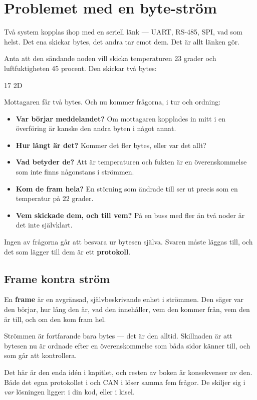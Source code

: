 \section{Problemet med en byte-ström}
\label{sec:stream}

Två system kopplas ihop med en seriell länk --- UART, RS-485, SPI, vad som helst. Det ena skickar
bytes, det andra tar emot dem. Det är allt länken gör.

Anta att den sändande noden vill skicka temperaturen 23 grader och luftfuktigheten 45 procent.
Den skickar två bytes:

\begin{console}
17 2D
\end{console}

Mottagaren får två bytes. Och nu kommer frågorna, i tur och ordning:

\begin{itemize}
  \item \textbf{Var börjar meddelandet?} Om mottagaren kopplades in mitt i en överföring är
     kanske den andra byten i något annat.
  \item \textbf{Hur långt är det?} Kommer det fler bytes, eller var det allt?
  \item \textbf{Vad betyder de?} Att  är temperaturen och  fukten är en
    överenskommelse som inte finns någonstans i strömmen.
  \item \textbf{Kom de fram hela?} En störning som ändrade  till  ser ut precis
    som en temperatur på 22 grader.
  \item \textbf{Vem skickade dem, och till vem?} På en buss med fler än två noder är det inte
    självklart.
\end{itemize}

Ingen av frågorna går att besvara ur bytesen själva. Svaren måste läggas till, och det som lägger
till dem är ett \textbf{protokoll}.

\subsection{Frame kontra ström}

En \textbf{frame} är en avgränsad, självbeskrivande enhet i strömmen. Den säger var den börjar,
hur lång den är, vad den innehåller, vem den kommer från, vem den är till, och om den kom fram
hel.

Strömmen är fortfarande bara bytes --- det är den alltid. Skillnaden är att bytesen nu är ordnade
efter en överenskommelse som båda sidor känner till, och som går att kontrollera.

\begin{aside}
\note Det här är den enda idén i kapitlet, och resten av boken är konsekvenser av den. Både det
egna protokollet i  och CAN i  löser samma fem frågor. De
skiljer sig i \emph{var} lösningen ligger: i din kod, eller i kisel.
\end{aside}
